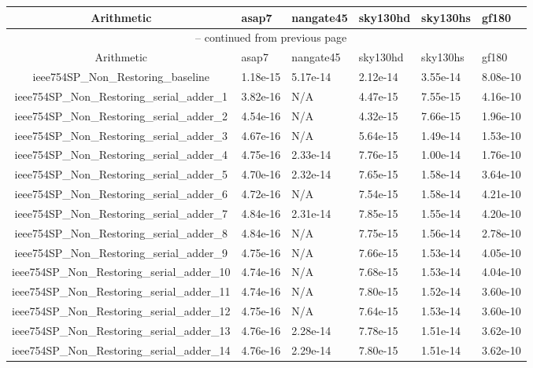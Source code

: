 \begin{tabularx}{\linewidth}{|c|X|X|X|X|X|}
\caption{Power (W) Data}\\
\hline
Arithmetic & asap7 & nangate45 & sky130hd & sky130hs & gf180\\ \hline
\endfirsthead
\multicolumn{6}{c}{{\tablename\ \thetable{} -- continued from previous page}}\\
\hline
Arithmetic & asap7 & nangate45 & sky130hd & sky130hs & gf180\\ \hline
\endhead
ieee754SP\_Non\_Restoring\_baseline & 1.18e-15 & 5.17e-14 & 2.12e-14 & 3.55e-14 & 8.08e-10\\ \hline
ieee754SP\_Non\_Restoring\_serial\_adder\_1 & 3.82e-16 & N/A & 4.47e-15 & 7.55e-15 & 4.16e-10\\ \hline
ieee754SP\_Non\_Restoring\_serial\_adder\_2 & 4.54e-16 & N/A & 4.32e-15 & 7.66e-15 & 1.96e-10\\ \hline
ieee754SP\_Non\_Restoring\_serial\_adder\_3 & 4.67e-16 & N/A & 5.64e-15 & 1.49e-14 & 1.53e-10\\ \hline
ieee754SP\_Non\_Restoring\_serial\_adder\_4 & 4.75e-16 & 2.33e-14 & 7.76e-15 & 1.00e-14 & 1.76e-10\\ \hline
ieee754SP\_Non\_Restoring\_serial\_adder\_5 & 4.70e-16 & 2.32e-14 & 7.65e-15 & 1.58e-14 & 3.64e-10\\ \hline
ieee754SP\_Non\_Restoring\_serial\_adder\_6 & 4.72e-16 & N/A & 7.54e-15 & 1.58e-14 & 4.21e-10\\ \hline
ieee754SP\_Non\_Restoring\_serial\_adder\_7 & 4.84e-16 & 2.31e-14 & 7.85e-15 & 1.55e-14 & 4.20e-10\\ \hline
ieee754SP\_Non\_Restoring\_serial\_adder\_8 & 4.84e-16 & N/A & 7.75e-15 & 1.56e-14 & 2.78e-10\\ \hline
ieee754SP\_Non\_Restoring\_serial\_adder\_9 & 4.75e-16 & N/A & 7.66e-15 & 1.53e-14 & 4.05e-10\\ \hline
ieee754SP\_Non\_Restoring\_serial\_adder\_10 & 4.74e-16 & N/A & 7.68e-15 & 1.53e-14 & 4.04e-10\\ \hline
ieee754SP\_Non\_Restoring\_serial\_adder\_11 & 4.74e-16 & N/A & 7.80e-15 & 1.52e-14 & 3.60e-10\\ \hline
ieee754SP\_Non\_Restoring\_serial\_adder\_12 & 4.75e-16 & N/A & 7.64e-15 & 1.53e-14 & 3.60e-10\\ \hline
ieee754SP\_Non\_Restoring\_serial\_adder\_13 & 4.76e-16 & 2.28e-14 & 7.78e-15 & 1.51e-14 & 3.62e-10\\ \hline
ieee754SP\_Non\_Restoring\_serial\_adder\_14 & 4.76e-16 & 2.29e-14 & 7.80e-15 & 1.51e-14 & 3.62e-10\\ \hline

\end{tabularx}
